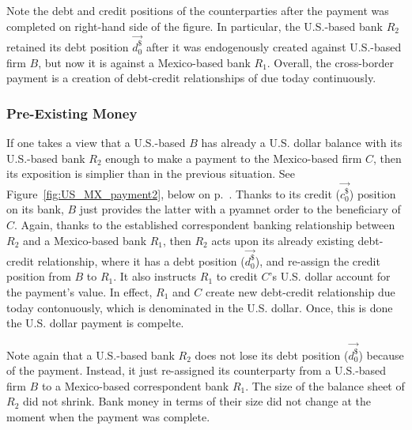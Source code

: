 Note the debt and credit positions of the counterparties after the payment was completed on right-hand side of the figure. In particular, the U.S.-based bank $R_2$ retained its debt position $\overrightarrow{d^{\$}_0}$ after it was endogenously created against U.S.-based firm $B$, but now it is against a Mexico-based bank $R_1$. Overall, the cross-border payment is a creation of debt-credit relationships of due today continuously.

\subsubsection{Pre-Existing Money}

If one takes a view that a U.S.-based $B$ has already a U.S. dollar balance with its U.S.-based bank $R_2$ enough to make a payment to the Mexico-based firm $C$, then its exposition is simplier than in the previous situation. See Figure~\ref{fig:US_MX_payment2}, below on p.~\pageref{fig:US_MX_payment2}. Thanks to its credit ($\overrightarrow{c^{\$}_{0}}$) position on its bank, $B$ just provides the latter with a pyamnet order to the beneficiary of $C$. Again, thanks to the established correspondent banking relationship between $R_2$ and a Mexico-based bank $R_1$, then $R_2$ acts upon its already existing debt-credit relationship, where it has a debt position ($\overrightarrow{d^{\$}_{0}}$), and re-assign the credit position from $B$ to $R_1$. It also instructs $R_1$ to credit $C$'s U.S. dollar account for the payment's value. In effect, $R_1$ and $C$ create new debt-credit relationship due today contonuously, which is denominated in the U.S. dollar. Once, this is done the U.S. dollar payment is compelte.

Note again that a U.S.-based bank $R_2$ does not lose its debt position ($\overrightarrow{d^{\$}_{0}}$) because of the payment. Instead, it just re-assigned its counterparty from a U.S.-based firm $B$ to a Mexico-based correspondent bank $R_1$. The size of the balance sheet of $R_2$ did not shrink. Bank money in terms of their size did not change at the moment when the payment was complete.

